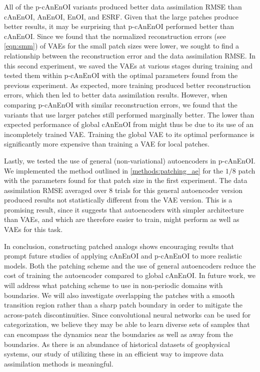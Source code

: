 \documentclass[final,3p]{elsarticle}
\theoremstyle{break}
\begin{document}
All of the p-cAnEnOI variants produced better data assimilation RMSE than cAnEnOI, AnEnOI, EnOI, and ESRF.
Given that the large patches produce better results, it may be surprising that p-cAnEnOI performed better than cAnEnOI. 
Since we found that the normalized reconstruction errors (see \cref{eqn:smm}) of VAEs for the small patch sizes were lower, we sought to find a relationship between the reconstruction error and the data assimilation RMSE.
In this second experiment, we saved the VAEs at various stages during training and tested them within p-cAnEnOI with the optimal parameters found from the previous experiment.
As expected, more training produced better reconstruction errors, which then led to better data assimilation results. 
However, when comparing p-cAnEnOI with similar reconstruction errors, we found that the variants that use larger patches still performed marginally better. 
The lower than expected performance of global cAnEnOI from \cite{grooms2020analog} might thus be due to its use of an incompletely trained VAE.
Training the global VAE to its optimal performance is significantly more expensive than training a VAE for local patches. \par 

Lastly, we tested the use of general (non-variational) autoencoders in p-cAnEnOI. 
We implemented the method outlined in \cref{methods:patching_ae} for the $1/8$ patch with the parameters found for that patch size in the first experiment. 
The data assimilation RMSE averaged over 8 trials for this general autoencoder version produced results not statistically different from the VAE version.
This is a promising result, since it suggests that autoencoders with simpler architecture than VAEs, and which are therefore easier to train, might perform as well as VAEs for this task.\par 
In conclusion, constructing patched analogs shows encouraging results that prompt future studies of applying cAnEnOI and p-cAnEnOI to more realistic models. 
Both the patching scheme and the use of general autoencoders reduce the cost of training the autoencoder compared to global cAnEnOI.
In future work, we will address what patching scheme to use in non-periodic domains with boundaries. 
We will also investigate overlapping the patches with a smooth transition region rather than a sharp patch boundary in order to mitigate the across-patch discontinuities.
Since convolutional neural networks can be used for categorization, we believe they may be able to learn diverse sets of samples that can encompass the dynamics near the boundaries as well as away from the boundaries. 
As there is an abundance of historical datasets of geophysical systems, our study of utilizing these in an efficient way to improve data assimilation methods is meaningful.
\end{document}
